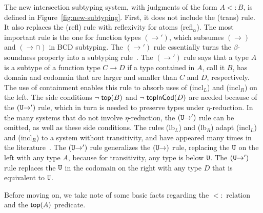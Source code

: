 \documentclass{article}
\begin{document}
The new intersection subtyping system, with judgments of the form $A
<: B$, is defined in Figure~\ref{fig:new-subtyping}. First, it does
not include the (trans) rule.  It also replaces the (refl) rule with
reflexivity for atoms (refl$_\alpha$). The most important rule is the
one for function types $(\to')$, which subsumes $(\to)$ and
$({\to}{\cap})$ in BCD subtyping.  The $(\to')$ rule essentially turns
the $\beta$-soundness property into a subtyping
rule~\citep{Barendregt:2013aa}. The $(\to')$ rule says that a type $A$
is a subtype of a function type $C \to D$ if a type contained in $A$,
call it $B$, has domain and codomain that are larger and smaller than
$C$ and $D$, respectively. The use of containment enables this rule to
absorb uses of (incl$_L$) and (incl$_R$) on the left.  The side
conditions $\neg\;\mathsf{top}(B)$ and $\neg\;\mathsf{topInCod}(D)$ are needed
because of the $(\mathtt{U}{\to}')$ rule, which in turn is needed to
preserve types under $\eta$-reduction.  In the many systems that do
not involve $\eta$-reduction, the $(\mathtt{U}{\to}')$ rule can be omitted,
as well as these side conditions. The rules (lb$_L$) and (lb$_R$)
adapt (incl$_L$) and (incl$_R$) to a system without transitivity, and
have appeared many times in the literature~\citep{Bakel:1995aa}.  The
$(\mathtt{U}{\to}')$ rule generalizes the $(\mathtt{U}{\to})$ rule, replacing the
$\mathtt{U}$ on the left with any type $A$, because for transitivity, any
type is below $\mathtt{U}$. The $(\mathtt{U}{\to}')$ rule replaces the $\mathtt{U}$ in
the codomain on the right with any type $D$ that is equivalent to
$\mathtt{U}$.

Before moving on, we take note of some basic facts regarding the $<:$
relation and the $\mathsf{top}(A)$ predicate.
\end{document}
